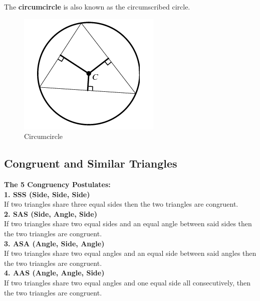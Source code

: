         \noindent The \textbf{circumcircle} is also known as the circumscribed circle. \\
        \begin{figure} [hbt!]
            \centering
            \includegraphics[scale = 0.75] {Resources/Unit2Triangles/circumcircle.PNG}
            \caption*{Circumcircle}
        \end{figure}



    \subsection{Congruent and Similar Triangles}
        \color{purple} \textbf{The 5 Congruency Postulates:} \color{black} \\

        \noindent \color{purple}\textbf{1. SSS (Side, Side, Side)} \color{black}\\
        \noindent If two triangles share three equal sides then the two triangles are congruent. \\

        \noindent \color{purple}\textbf{2. SAS (Side, Angle, Side)}\color{black} \\
        \noindent If two triangles share two equal sides and an equal angle between said sides
        then the two triangles are congruent. \\

        \noindent \color{purple}\textbf{3. ASA (Angle, Side, Angle)}\color{black} \\
        \noindent If two triangles share two equal angles and an equal side between said angles
        then the two triangles are congruent. \\

        \noindent \color{purple}\textbf{4. AAS (Angle, Angle, Side)}\color{black} \\
        \noindent If two triangles share two equal angles and one equal side all consecutively,
        then the two triangles are congruent. \\


